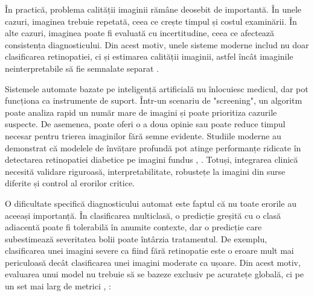 \documentclass[12pt, a4paper, twoside, romanian]{teza-upb}
\begin{document}
În practică, problema calității imaginii rămâne deosebit de importantă. În unele cazuri,
imaginea trebuie repetată, ceea ce crește timpul și costul examinării. În alte
cazuri, imaginea poate fi evaluată cu incertitudine, ceea ce afectează consistența diagnosticului.
Din acest motiv, unele sisteme moderne includ nu doar clasificarea retinopatiei, ci
și estimarea calității imaginii, astfel încât imaginile neinterpretabile să fie semnalate separat
\cite{14_liu2022deepdrid}.
\bigskip

Sistemele automate bazate pe inteligență artificială nu înlocuiesc medicul, dar pot funcționa
ca instrumente de suport. Într-un scenariu de "screening", un algoritm poate analiza
rapid un număr mare de imagini și poate prioritiza cazurile suspecte. De
asemenea, poate oferi o a doua opinie sau poate reduce timpul necesar
pentru trierea imaginilor fără semne evidente. Studiile moderne au demonstrat că modelele
de învățare profundă pot atinge performanțe ridicate în detectarea retinopatiei diabetice pe
imagini fundus \cite{3_gulshan2016development}, \cite{15_li2019diagnostic}. Totuși, integrarea clinică necesită validare riguroasă, interpretabilitate, robustețe
la imagini din surse diferite și control al erorilor critice.
\bigskip

O dificultate specifică diagnosticului automat este faptul că nu toate erorile au
aceeași importanță. În clasificarea multiclasă, o predicție greșită cu o clasă adiacentă
poate fi tolerabilă în anumite contexte, dar o predicție care subestimează severitatea
bolii poate întârzia tratamentul. De exemplu, clasificarea unei imagini severe ca fiind
fără retinopatie este o eroare mult mai periculoasă decât clasificarea unei imagini
moderate ca ușoare. Din acest motiv, evaluarea unui model nu trebuie să
se bazeze exclusiv pe acuratețe globală, ci pe un set mai larg
de metrici \cite{15_li2019diagnostic}, \cite{14_liu2022deepdrid}:
\end{document}
